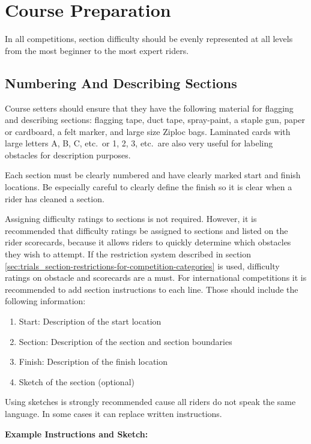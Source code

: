 \section{Course Preparation}

In all competitions, section difficulty should be evenly represented at all levels from the most beginner to the most expert riders.

\subsection{Numbering And Describing Sections \label{sec:trials_guidelines-for-course-setters}}
Course setters should ensure that they have the following material for flagging and describing sections: flagging tape, duct tape, spray-paint, a staple gun, paper or cardboard, a felt marker, and large size Ziploc bags.
Laminated cards with large letters A, B, C, etc.\ or 1, 2, 3, etc.\ are also very useful for labeling obstacles for description purposes.

Each section must be clearly numbered and have clearly marked start and finish locations.
Be especially careful to clearly define the finish so it is clear when a rider has cleaned a section.

Assigning difficulty ratings to sections is not required.
However, it is recommended that difficulty ratings be assigned to sections and listed on the rider scorecards, because it allows riders to quickly determine which obstacles they wish to attempt.
If the restriction system described in section \ref{sec:trials_section-restrictions-for-competition-categories} is used, difficulty ratings on obstacle and scorecards are a must.
For international competitions it is recommended to add section instructions to each line.
Those should include the following information:

\begin{enumerate}
\item  Start: Description of the start location
\item Section: Description of the section and section boundaries
\item Finish: Description of the finish location
\item Sketch of the section (optional)
\end{enumerate}
Using sketches is strongly recommended cause all riders do not speak the same language.
In some cases it can replace written instructions.

\textbf{Example Instructions and Sketch:}

